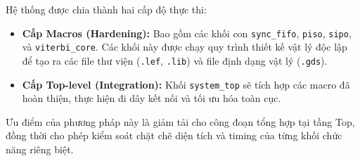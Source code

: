 \documentclass[12pt,a4paper]{report}
\begin{document}
Hệ thống được chia thành hai cấp độ thực thi:
\begin{itemize}
    \item \textbf{Cấp Macros (Hardening):} Bao gồm các khối con \texttt{sync\_fifo}, \texttt{piso}, \texttt{sipo}, và \texttt{viterbi\_core}. Các khối này được chạy quy trình thiết kế vật lý độc lập để tạo ra các file thư viện (\texttt{.lef}, \texttt{.lib}) và file định dạng vật lý (\texttt{.gds}).
    \item \textbf{Cấp Top-level (Integration):} Khối \texttt{system\_top} sẽ tích hợp các macro đã hoàn thiện, thực hiện đi dây kết nối và tối ưu hóa toàn cục.
\end{itemize}

Ưu điểm của phương pháp này là giảm tải cho công đoạn tổng hợp tại tầng Top, đồng thời cho phép kiểm soát chặt chẽ diện tích và timing của từng khối chức năng riêng biệt.
\end{document}
